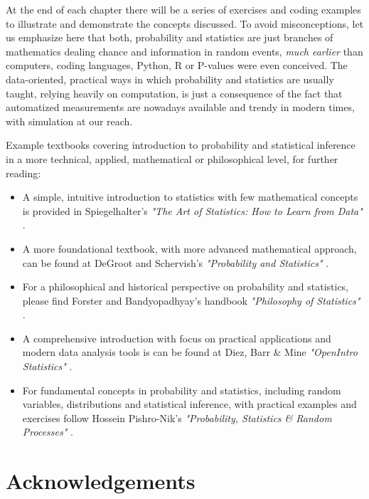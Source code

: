 \medskip

At the end of each chapter there will be a series of exercises and coding examples to illustrate and demonstrate the concepts discussed. To avoid misconceptions, let us emphasize here that both, probability and statistics are just branches of mathematics dealing chance and information in random events, \textit{much earlier} than computers, coding languages, \textsf{Python}, \textsf{R} or P-values were even conceived. The data-oriented, practical ways in which probability and statistics are usually taught, relying heavily on computation, is just a consequence of the fact that automatized measurements are nowadays available and trendy in modern times, with simulation at our reach.

\medskip

Example textbooks covering introduction to probability and statistical inference in a more technical, applied, mathematical or philosophical level, for further reading:

\begin{itemize}
    \item A simple, intuitive introduction to statistics with few mathematical concepts is provided in Spiegelhalter's \textit{"The Art of Statistics: How to Learn from Data"} \cite{spiegelhalter_2019_art}. 
    \item A more foundational textbook, with more advanced mathematical approach, can be found at DeGroot and Schervish's \textit{"Probability and Statistics"} \cite{degroot_2012_probability}.   
    \item For a philosophical and historical perspective on probability and statistics, please find Forster and Bandyopadhyay's handbook \textit{"Philosophy of Statistics"} \cite{bandyopadhyay_2011_philosophy}.
    \item A comprehensive introduction with focus on practical applications and modern data analysis tools is can be found at Diez, Barr \& Mine \textit{"OpenIntro Statistics"} \cite{diez_2025_openintro}.
    \item For fundamental concepts in probability and statistics, including random variables, distributions and statistical inference, with practical examples and exercises follow Hossein Pishro-Nik's \textit{"Probability, Statistics \& Random Processes"} \cite{pishronik_2014_introduction}.
\end{itemize}

\newpage

\section*{Acknowledgements}

